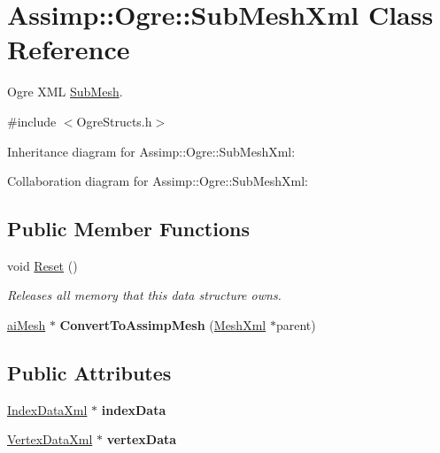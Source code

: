 \hypertarget{class_assimp_1_1_ogre_1_1_sub_mesh_xml}{\section{Assimp\+:\+:Ogre\+:\+:Sub\+Mesh\+Xml Class Reference}
\label{class_assimp_1_1_ogre_1_1_sub_mesh_xml}
}


Ogre X\+M\+L \hyperlink{class_assimp_1_1_ogre_1_1_sub_mesh}{Sub\+Mesh}.  




{\ttfamily \#include $<$Ogre\+Structs.\+h$>$}



Inheritance diagram for Assimp\+:\+:Ogre\+:\+:Sub\+Mesh\+Xml\+:


Collaboration diagram for Assimp\+:\+:Ogre\+:\+:Sub\+Mesh\+Xml\+:
\subsection*{Public Member Functions}
\begin{DoxyCompactItemize}
\item 
\hypertarget{class_assimp_1_1_ogre_1_1_sub_mesh_xml_af849a5d03616ae4040c3afedc1b31b56}{void \hyperlink{class_assimp_1_1_ogre_1_1_sub_mesh_xml_af849a5d03616ae4040c3afedc1b31b56}{Reset} ()}\label{class_assimp_1_1_ogre_1_1_sub_mesh_xml_af849a5d03616ae4040c3afedc1b31b56}

\begin{DoxyCompactList}\small\item\em Releases all memory that this data structure owns. \end{DoxyCompactList}\item 
\hypertarget{class_assimp_1_1_ogre_1_1_sub_mesh_xml_ac4003f8070e0e92296f0177b7888c3ee}{\hyperlink{structai_mesh}{ai\+Mesh} $\ast$ {\bfseries Convert\+To\+Assimp\+Mesh} (\hyperlink{class_assimp_1_1_ogre_1_1_mesh_xml}{Mesh\+Xml} $\ast$parent)}\label{class_assimp_1_1_ogre_1_1_sub_mesh_xml_ac4003f8070e0e92296f0177b7888c3ee}

\end{DoxyCompactItemize}
\subsection*{Public Attributes}
\begin{DoxyCompactItemize}
\item 
\hypertarget{class_assimp_1_1_ogre_1_1_sub_mesh_xml_a073c8d8290ba55a2201b797ff352ad30}{\hyperlink{class_assimp_1_1_ogre_1_1_index_data_xml}{Index\+Data\+Xml} $\ast$ {\bfseries index\+Data}}\label{class_assimp_1_1_ogre_1_1_sub_mesh_xml_a073c8d8290ba55a2201b797ff352ad30}

\item 
\hypertarget{class_assimp_1_1_ogre_1_1_sub_mesh_xml_ae5cceac9a8b0c6c455bc597a108d3215}{\hyperlink{class_assimp_1_1_ogre_1_1_vertex_data_xml}{Vertex\+Data\+Xml} $\ast$ {\bfseries vertex\+Data}}\label{class_assimp_1_1_ogre_1_1_sub_mesh_xml_ae5cceac9a8b0c6c455bc597a108d3215}

\end{DoxyCompactItemize}
